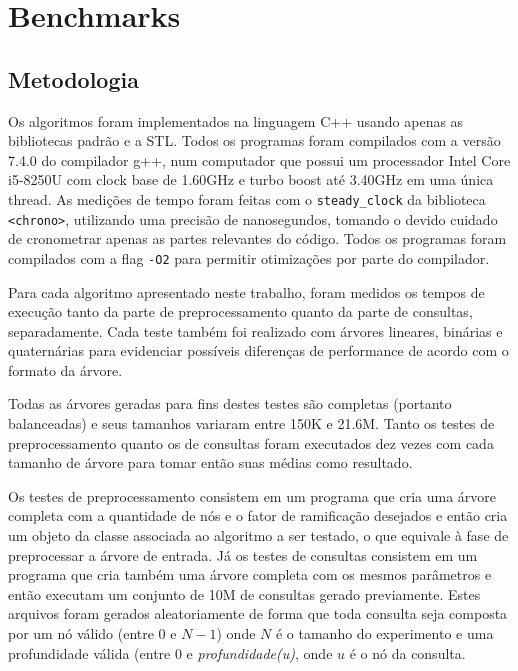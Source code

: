
\chapter{Benchmarks}
\label{chap:benchmarks}

\section{Metodologia}
Os algoritmos foram implementados na linguagem C++ usando apenas as bibliotecas
padrão e a STL. Todos os programas foram compilados com a versão 7.4.0 do
compilador g++, num computador que possui um processador Intel Core i5-8250U
com clock base de 1.60GHz e turbo boost até 3.40GHz em uma única thread. As medições
de tempo foram feitas com o \texttt{steady\_clock} da biblioteca \texttt{<chrono>},
utilizando uma precisão de nanosegundos, tomando o devido cuidado de cronometrar apenas
as partes relevantes do código. Todos os programas foram compilados com a flag
\texttt{-O2} para permitir otimizações por parte do compilador.

Para cada algoritmo apresentado neste trabalho, foram medidos os tempos de execução tanto
da parte de preprocessamento quanto da parte de consultas, separadamente. Cada teste
também foi realizado com árvores lineares, binárias e quaternárias para evidenciar 
possíveis diferenças de performance de acordo com o formato da árvore.

Todas as árvores geradas para fins destes testes são completas (portanto balanceadas) 
e seus tamanhos variaram entre 150K e 21.6M. Tanto os testes de preprocessamento quanto
os de consultas foram executados dez vezes com cada tamanho de árvore para tomar então
suas médias como resultado. 

Os testes de preprocessamento consistem em um programa que cria uma árvore completa
com a quantidade de nós e o fator de ramificação desejados e então cria um objeto da
classe associada ao algoritmo a ser testado, o que equivale à fase de preprocessar a
árvore de entrada. Já os testes de consultas consistem em um programa que cria também
uma árvore completa com os mesmos parâmetros e então executam um conjunto de 10M de
consultas gerado previamente. Estes arquivos foram gerados aleatoriamente de forma que
toda consulta seja composta por um nó válido (entre 0 e $N-1$) onde $N$ é o tamanho do
experimento e uma profundidade válida (entre 0 e \textit{profundidade(u)}, onde $u$ é
o nó da consulta.

